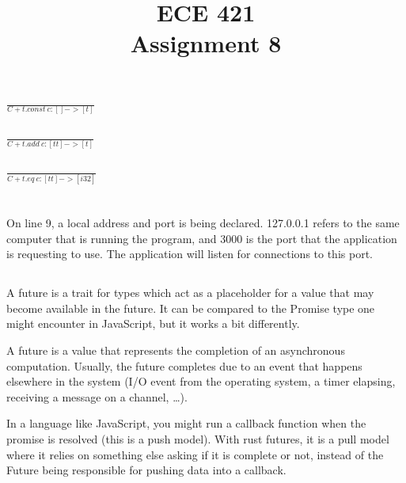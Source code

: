 \documentclass[letterpaper]{article}
\title{ECE 421 \\
Assignment 8}
\author{\ME}
\begin{document}
\maketitle %

\section{}
\subsection{}
\(\frac{}{C + t.const\ c: [] ->[t]}\)
\subsection{}
\(\frac{}{C + t.add\ c: [t t] ->[t]}\)
\subsection{}
\(\frac{}{C + t.eq\ c: [t t] ->[i32]}\)

\section{}
\subsection{}
On line 9, a local address and port is being declared. 127.0.0.1 refers to the
same computer that is running the program, and 3000 is the port that the
application is requesting to use. The application will listen for connections
to this port.

\subsection{}
A future is a trait for types which act as a placeholder for a value that may 
become available in the future. It can be compared to the Promise type
one might encounter in JavaScript, but it works a bit differently.

A future is a value that represents the completion of an asynchronous computation.
Usually, the future completes due to an event that happens elsewhere in the system 
(I/O event from the operating system, a timer elapsing, receiving a message on a channel, …).

In a language like JavaScript, you might run a callback function when the
promise is resolved (this is a push model). With rust futures, it is a pull
model where it relies on something else asking if it is complete or not, instead
of the Future being responsible for pushing data into a callback.
\end{document}
